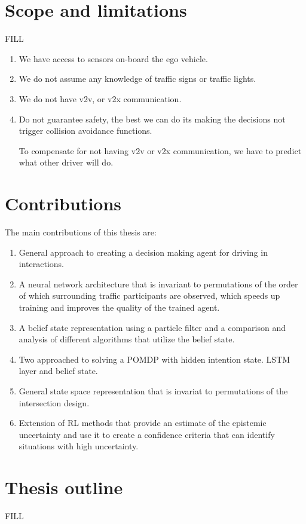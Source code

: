 \section{Scope and limitations}
FILL
\begin{enumerate}
	\item We have access to sensors on-board the ego vehicle. 
	\item We do not assume any knowledge of traffic signs or traffic lights. 
	\item We do not have v2v, or v2x communication. 
	\item Do not guarantee safety, the best we can do its making the decisions not trigger collision avoidance functions. 
	
	To compensate for not having v2v or v2x communication, we have to predict what other driver will do. 
	
\end{enumerate}


\section{Contributions}
The main contributions of this thesis are:
\begin{enumerate}
	\item General approach to creating a decision making agent for driving in interactions. 
	\item A neural network architecture that is invariant to permutations of the order of which surrounding traffic participants are observed, which speeds up training and improves the quality of the trained agent. 
	\item A belief state representation using a particle filter and a comparison and analysis of different algorithms that utilize the belief state. 
	\item Two approached to solving a POMDP with hidden intention state. LSTM layer and belief state. 
	\item General state space representation that is invariat to permutations of the intersection design. 
	\item Extension of RL methods that provide an estimate of the epistemic uncertainty and use it to create a confidence criteria that can identify situations with high uncertainty. 

\end{enumerate}


\section{Thesis outline}
FILL


